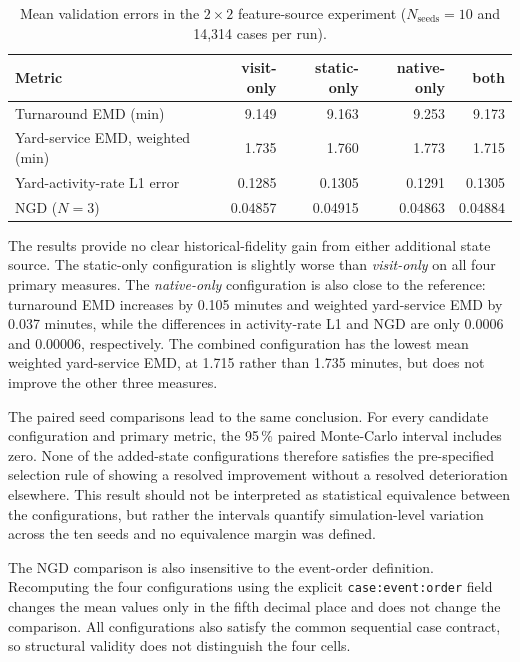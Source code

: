 \begin{table}[htbp]
\centering
\small
\setlength{\tabcolsep}{3.0pt}
\begin{tabular}{L{4.2cm}rrrr}
\toprule
\textbf{Metric} & \textbf{visit-only} & \textbf{static-only} &
\textbf{native-only} & \textbf{both} \\
\midrule
Turnaround EMD (min) & 9.149 & 9.163 & 9.253 & 9.173 \\
Yard-service EMD, weighted (min) & 1.735 & 1.760 & 1.773 & 1.715 \\
Yard-activity-rate L1 error & 0.1285 & 0.1305 & 0.1291 & 0.1305 \\
NGD ($N=3$) & 0.04857 & 0.04915 & 0.04863 & 0.04884 \\
\bottomrule
\end{tabular}
\caption{Mean validation errors in the $2\times2$ feature-source experiment
($N_{\text{seeds}}=10$ and 14,314 cases per run).}
\label{tab:configuration_screening}
\end{table}

The results provide no clear historical-fidelity gain from either additional
state source. The static-only configuration is slightly worse than
\textit{visit-only} on all four primary measures. The \textit{native-only}
configuration is also close to the reference: turnaround EMD increases by
0.105 minutes and weighted yard-service EMD by 0.037 minutes, while the
differences in activity-rate L1 and NGD are only 0.0006 and 0.00006,
respectively. The combined configuration has the lowest mean weighted
yard-service EMD, at 1.715 rather than 1.735 minutes, but does not improve the
other three measures.

The paired seed comparisons lead to the same conclusion. For every candidate
configuration and primary metric, the 95\,\% paired Monte-Carlo interval
includes zero. None of the added-state configurations therefore satisfies the
pre-specified selection rule of showing a resolved improvement without a
resolved deterioration elsewhere. This result should not be interpreted as
statistical equivalence between the configurations, but rather the intervals quantify
simulation-level variation across the ten seeds and no equivalence margin was
defined.

The NGD comparison is also insensitive to the event-order definition.
Recomputing the four configurations using the explicit
\texttt{case:event:order} field changes the mean values only in the fifth
decimal place and does not change the comparison. All configurations also
satisfy the common sequential case contract, so structural validity does not
distinguish the four cells.

